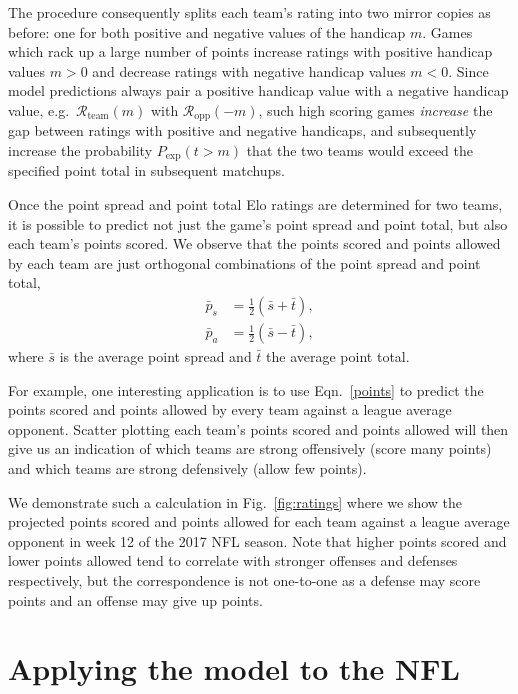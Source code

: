 \documentclass[aps,prc,reprint,amsmath,superscriptaddress,nofootinbib]{revtex4-1}
\begin{document}
The procedure consequently splits each team's rating into two mirror copies as before: one for both positive and negative values of the handicap $m$.
Games which rack up a large number of points increase ratings with positive handicap values $m > 0$ and decrease ratings with negative handicap values $m < 0$.
Since model predictions always pair a positive handicap value with a negative handicap value, e.g.\ $\mathcal{R}_\text{team}(m)$ with $\mathcal{R}_\text{opp}(-m)$, such high scoring games \emph{increase} the gap between ratings with positive and negative handicaps, and subsequently increase the probability $P_\text{exp}(t > m)$ that the two teams would exceed the specified point total in subsequent matchups.

Once the point spread and point total Elo ratings are determined for two teams, it is possible to predict not just the game's point spread and point total, but also each team's points scored.
We observe that the points scored and points allowed by each team are just orthogonal combinations of the point spread and point total,
\begin{align}
  \bar{p}_s &= \tfrac{1}{2}(\bar{s} + \bar{t}),\nonumber \\
  \bar{p}_a &= \tfrac{1}{2}(\bar{s} - \bar{t}),
  \label{points}
\end{align}
where $\bar{s}$ is the average point spread and $\bar{t}$ the average point total.

For example, one interesting application is to use Eqn.~\eqref{points} to predict the points scored and points allowed by every team against a league average opponent.
Scatter plotting each team's points scored and points allowed will then give us an indication of which teams are strong offensively (score many points) and which teams are strong defensively (allow few points).

We demonstrate such a calculation in Fig.~\ref{fig:ratings} where we show the projected points scored and points allowed for each team against a league average opponent in week 12 of the 2017 NFL season.
Note that higher points scored and lower points allowed tend to correlate with stronger offenses and defenses respectively, but the correspondence is not one-to-one as a defense may score points and an offense may give up points.

\section{Applying the model to the NFL}
\end{document}
